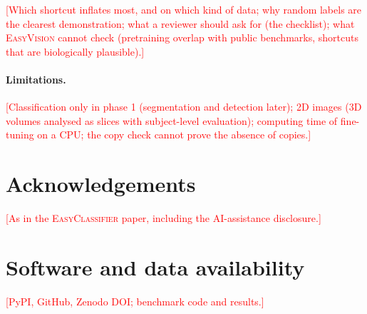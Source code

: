 \documentclass[11pt,a4paper]{article}
\newcommand{\EV}{\textsc{EasyVision}}
\newcommand{\EC}{\textsc{EasyClassifier}}
\newcommand{\TBD}[1]{\textcolor{red}{[#1]}}
\begin{document}
\TBD{Which shortcut inflates most, and on which kind of data; why random labels are the clearest demonstration; what a reviewer should ask for (the checklist); what \EV{} cannot check (pretraining overlap with public benchmarks, shortcuts that are biologically plausible).}

\paragraph{Limitations.} \TBD{Classification only in phase 1 (segmentation and detection later); 2D images (3D volumes analysed as slices with subject-level evaluation); computing time of fine-tuning on a CPU; the copy check cannot prove the absence of copies.}

\section*{Acknowledgements}
\TBD{As in the \EC{} paper, including the AI-assistance disclosure.}

\section*{Software and data availability}
\TBD{PyPI, GitHub, Zenodo DOI; benchmark code and results.}



\end{document}
